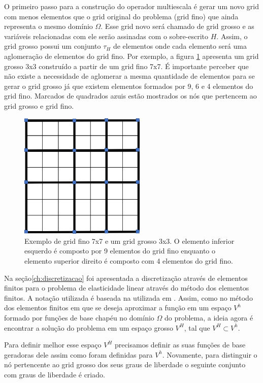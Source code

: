 \documentclass{article}
\begin{document}
O primeiro passo para a construção do operador multiescala é gerar um novo grid com menos elementos que o grid original do problema (grid fino) que ainda representa o mesmo domínio $\Omega$. Esse grid novo será chamado de grid grosso e as variáveis relacionadas com ele serão assinadas com o sobre-escrito $H$. 
Assim, o grid grosso possui um conjunto $\tau_H$ de elementos onde cada elemento será uma aglomeração de elementos do grid fino. Por exemplo, a figura \ref{fig:gridgrosso} apresenta um grid grosso 3x3 construído a partir de um grid fino 7x7. É importante perceber que não existe a necessidade de aglomerar a mesma quantidade de elementos para se gerar o grid grosso já que existem elementos formados por 9, 6 e 4 elementos do grid fino. Marcados de quadrados azuis estão mostrados os nós que pertencem ao grid grosso e grid fino.

\begin{figure}[!htbp]
\label{fig:gridgrosso}
\centering
\includegraphics[width=6cm]{figs/grosso.png}
\caption{Exemplo de grid fino 7x7 e um grid grosso 3x3. O elemento inferior esquerdo é composto por 9 elementos do grid fino enquanto o elemento superior direito é composto com 4 elementos do grid fino.}
\end{figure}


Na seção\ref{ch:discretizacao} foi apresentada a discretização através de elementos finitos para o problema de elasticidade linear através do método dos elementos finitos. A notação utilizada é baseada na utilizada em \cite{mbuck}. Assim, como no método dos elementos finitos em que se deseja aproximar a função em um espaço $V^h$ formado por funções de base chapéu no domínio $\Omega$ do problema, a ideia agora é encontrar a solução do problema em um espaço grosso $V^{H}$, tal que $V^{H} \subset V^h$. 



Para definir melhor esse espaço $V^{H}$ precisamos definir as suas funções de base geradoras dele assim como foram definidas para $V^h$.  Novamente, para distinguir o nó pertencente ao grid grosso dos seus graus de liberdade o seguinte conjunto com graus de liberdade é criado.
\end{document}

